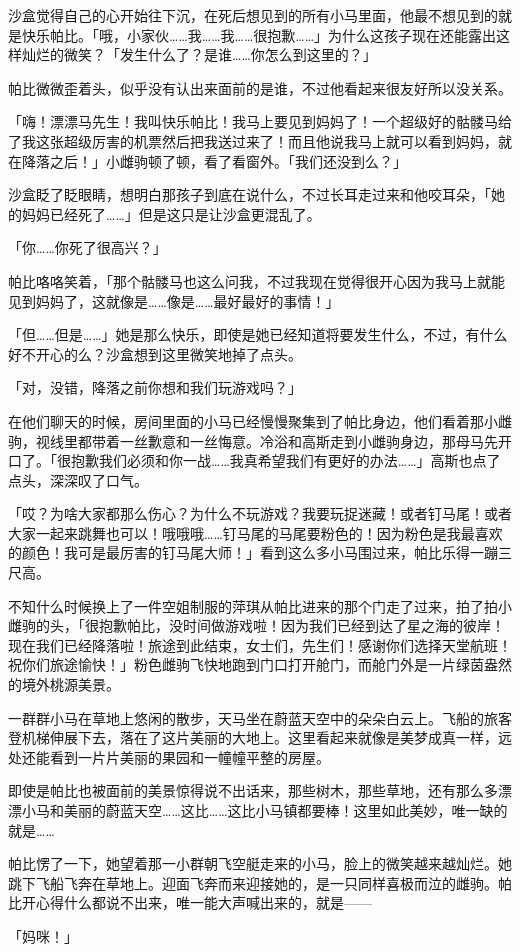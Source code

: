 沙盒觉得自己的心开始往下沉，在死后想见到的所有小马里面，他最不想见到的就是快乐帕比。「哦，小家伙……我……我……很抱歉……」为什么这孩子现在还能露出这样灿烂的微笑？「发生什么了？是谁……你怎么到这里的？」

帕比微微歪着头，似乎没有认出来面前的是谁，不过他看起来很友好所以没关系。

「嗨！漂漂马先生！我叫快乐帕比！我马上要见到妈妈了！一个超级好的骷髅马给了我这张超级厉害的机票然后把我送过来了！而且他说我马上就可以看到妈妈，就在降落之后！」小雌驹顿了顿，看了看窗外。「我们还没到么？」

沙盒眨了眨眼睛，想明白那孩子到底在说什么，不过长耳走过来和他咬耳朵，「她的妈妈已经死了……」但是这只是让沙盒更混乱了。

「你……你死了很高兴？」

帕比咯咯笑着，「那个骷髅马也这么问我，不过我现在觉得很开心因为我马上就能见到妈妈了，这就像是……像是……最好最好的事情！」

「但……但是……」她是那么快乐，即使是她已经知道将要发生什么，不过，有什么好不开心的么？沙盒想到这里微笑地掉了点头。

「对，没错，降落之前你想和我们玩游戏吗？」

在他们聊天的时候，房间里面的小马已经慢慢聚集到了帕比身边，他们看着那小雌驹，视线里都带着一丝歉意和一丝悔意。冷浴和高斯走到小雌驹身边，那母马先开口了。「很抱歉我们必须和你一战……我真希望我们有更好的办法……」高斯也点了点头，深深叹了口气。

「哎？为啥大家都那么伤心？为什么不玩游戏？我要玩捉迷藏！或者钉马尾！或者大家一起来跳舞也可以！哦哦哦……钉马尾的马尾要粉色的！因为粉色是我最喜欢的颜色！我可是最厉害的钉马尾大师！」看到这么多小马围过来，帕比乐得一蹦三尺高。

不知什么时候换上了一件空姐制服的萍琪从帕比进来的那个门走了过来，拍了拍小雌驹的头，「很抱歉帕比，没时间做游戏啦！因为我们已经到达了星之海的彼岸！现在我们已经降落啦！旅途到此结束，女士们，先生们！感谢你们选择天堂航班！祝你们旅途愉快！」粉色雌驹飞快地跑到门口打开舱门，而舱门外是一片绿茵盎然的境外桃源美景。

一群群小马在草地上悠闲的散步，天马坐在蔚蓝天空中的朵朵白云上。飞船的旅客登机梯伸展下去，落在了这片美丽的大地上。这里看起来就像是美梦成真一样，远处还能看到一片片美丽的果园和一幢幢平整的房屋。

即使是帕比也被面前的美景惊得说不出话来，那些树木，那些草地，还有那么多漂漂小马和美丽的蔚蓝天空……这比……这比小马镇都要棒！这里如此美妙，唯一缺的就是……

帕比愣了一下，她望着那一小群朝飞空艇走来的小马，脸上的微笑越来越灿烂。她跳下飞船飞奔在草地上。迎面飞奔而来迎接她的，是一只同样喜极而泣的雌驹。帕比开心得什么都说不出来，唯一能大声喊出来的，就是——

「妈咪！」



